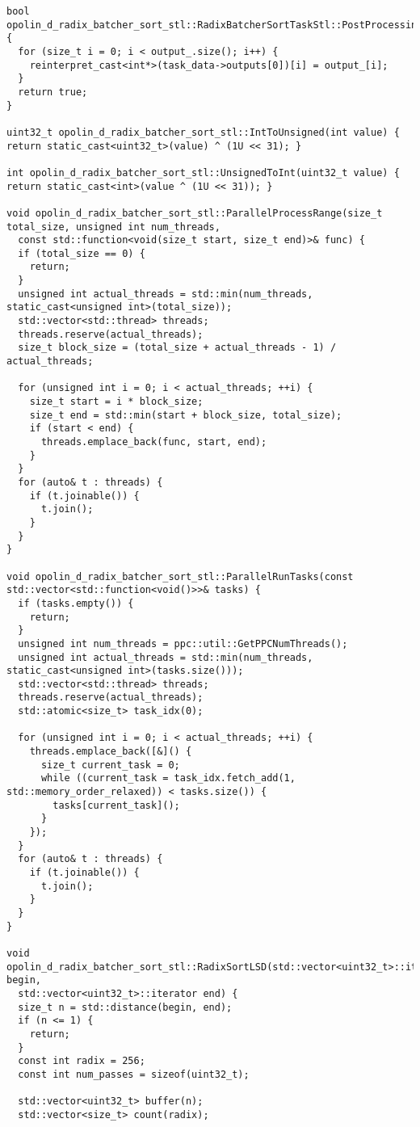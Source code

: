 \documentclass[12pt,a4paper]{extarticle}
\begin{document}
\begin{lstlisting}
bool opolin_d_radix_batcher_sort_stl::RadixBatcherSortTaskStl::PostProcessingImpl() {
  for (size_t i = 0; i < output_.size(); i++) {
    reinterpret_cast<int*>(task_data->outputs[0])[i] = output_[i];
  }
  return true;
}

uint32_t opolin_d_radix_batcher_sort_stl::IntToUnsigned(int value) { return static_cast<uint32_t>(value) ^ (1U << 31); }

int opolin_d_radix_batcher_sort_stl::UnsignedToInt(uint32_t value) { return static_cast<int>(value ^ (1U << 31)); }

void opolin_d_radix_batcher_sort_stl::ParallelProcessRange(size_t total_size, unsigned int num_threads,
  const std::function<void(size_t start, size_t end)>& func) {
  if (total_size == 0) {
    return;
  }
  unsigned int actual_threads = std::min(num_threads, static_cast<unsigned int>(total_size));
  std::vector<std::thread> threads;
  threads.reserve(actual_threads);
  size_t block_size = (total_size + actual_threads - 1) / actual_threads;

  for (unsigned int i = 0; i < actual_threads; ++i) {
    size_t start = i * block_size;
    size_t end = std::min(start + block_size, total_size);
    if (start < end) {
      threads.emplace_back(func, start, end);
    }
  }
  for (auto& t : threads) {
    if (t.joinable()) {
      t.join();
    }
  }
}

void opolin_d_radix_batcher_sort_stl::ParallelRunTasks(const std::vector<std::function<void()>>& tasks) {
  if (tasks.empty()) {
    return;
  }
  unsigned int num_threads = ppc::util::GetPPCNumThreads();
  unsigned int actual_threads = std::min(num_threads, static_cast<unsigned int>(tasks.size()));
  std::vector<std::thread> threads;
  threads.reserve(actual_threads);
  std::atomic<size_t> task_idx(0);

  for (unsigned int i = 0; i < actual_threads; ++i) {
    threads.emplace_back([&]() {
      size_t current_task = 0;
      while ((current_task = task_idx.fetch_add(1, std::memory_order_relaxed)) < tasks.size()) {
        tasks[current_task]();
      }
    });
  }
  for (auto& t : threads) {
    if (t.joinable()) {
      t.join();
    }
  }
}

void opolin_d_radix_batcher_sort_stl::RadixSortLSD(std::vector<uint32_t>::iterator begin,
  std::vector<uint32_t>::iterator end) {
  size_t n = std::distance(begin, end);
  if (n <= 1) {
    return;
  }
  const int radix = 256;
  const int num_passes = sizeof(uint32_t);

  std::vector<uint32_t> buffer(n);
  std::vector<size_t> count(radix);


\end{lstlisting}
\end{document}

